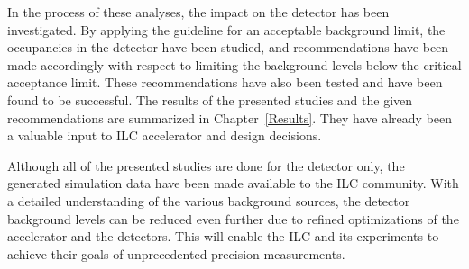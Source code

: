 In the process of these analyses, the impact on the \sid detector has been investigated.
By applying the \sid guideline for an acceptable background limit, the occupancies in the detector have been studied, and recommendations have been made accordingly with respect to limiting the background levels below the critical acceptance limit.
These recommendations have also been tested and have been found to be successful. 
The results of the presented studies and the given recommendations are summarized in Chapter~\ref{Results}.
They have already been a valuable input to ILC accelerator and \sid design decisions.

Although all of the presented studies are done for the \sid detector only, the generated simulation data have been made available to the ILC community.
With a detailed understanding of the various background sources, the detector background levels can be reduced even further due to refined optimizations of the accelerator and the detectors.
This will enable the ILC and its experiments to achieve their goals of unprecedented precision measurements.